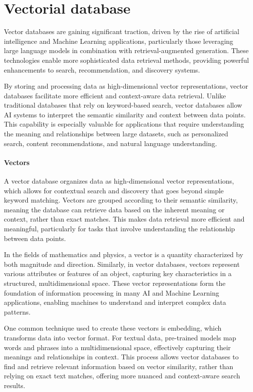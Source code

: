 \section{Vectorial database}

Vector databases are gaining significant traction, driven by the rise of artificial intelligence and Machine Learning applications, particularly those leveraging large language models in combination with retrieval-augmented generation. 
These technologies enable more sophisticated data retrieval methods, providing powerful enhancements to search, recommendation, and discovery systems. 

By storing and processing data as high-dimensional vector representations, vector databases facilitate more efficient and context-aware data retrieval. 
Unlike traditional databases that rely on keyword-based search, vector databases allow AI systems to interpret the semantic similarity and context between data points. 
This capability is especially valuable for applications that require understanding the meaning and relationships between large datasets, such as personalized search, content recommendations, and natural language understanding.

\paragraph*{Vectors}
A vector database organizes data as high-dimensional vector representations, which allows for contextual search and discovery that goes beyond simple keyword matching. 
Vectors are grouped according to their semantic similarity, meaning the database can retrieve data based on the inherent meaning or context, rather than exact matches. 
This makes data retrieval more efficient and meaningful, particularly for tasks that involve understanding the relationship between data points.

In the fields of mathematics and physics, a vector is a quantity characterized by both magnitude and direction. 
Similarly, in vector databases, vectors represent various attributes or features of an object, capturing key characteristics in a structured, multidimensional space. 
These vector representations form the foundation of information processing in many AI and Machine Learning applications, enabling machines to understand and interpret complex data patterns.

One common technique used to create these vectors is embedding, which transforms data into vector format. 
For textual data, pre-trained models map words and phrases into a multidimensional space, effectively capturing their meanings and relationships in context. 
This process allows vector databases to find and retrieve relevant information based on vector similarity, rather than relying on exact text matches, offering more nuanced and context-aware search results.

